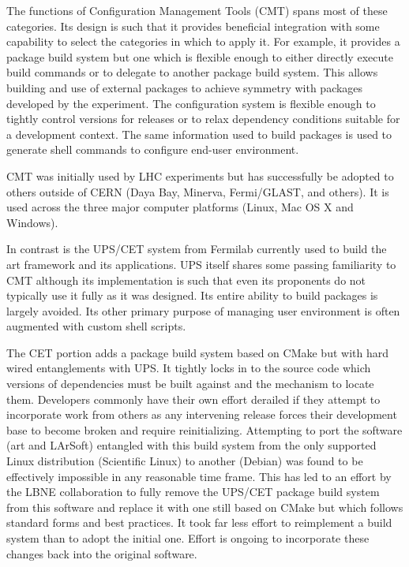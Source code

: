The functions of Configuration Management Tools (CMT) spans most of these categories.
Its design is such that it provides beneficial integration with some
capability to select the categories in which to apply it.  For
example, it provides a package build system but one which is flexible
enough to either directly execute build commands or to delegate to
another package build system.  This allows building and use of
external packages to achieve symmetry with packages developed by the
experiment.  The configuration system is flexible enough to tightly
control versions for releases or to relax dependency conditions
suitable for a development context.  The same information used to
build packages is used to generate shell commands to configure
end-user environment.

CMT was initially used by LHC experiments but has successfully be
adopted to others outside of CERN (Daya Bay, Minerva, Fermi/GLAST, and
others).  It is used across the three major computer platforms (Linux,
Mac OS X and Windows).

In contrast is the UPS/CET system from Fermilab currently used to
build the art framework and its applications.  UPS itself shares some
passing familiarity to CMT although its implementation is such that
even its proponents do not typically use it fully as it was designed.  Its
entire ability to build packages is largely avoided.  Its other
primary purpose of managing user environment is often augmented with
custom shell scripts.  

The CET portion adds a package build system based on CMake but with
hard wired entanglements with UPS.  It tightly locks in to the source
code which versions of dependencies must be built against and the
mechanism to locate them.  Developers commonly have their own effort
derailed if they attempt to incorporate work from others as any
intervening release forces their development base to become broken and
require reinitializing.  Attempting to port the software (art and
LArSoft) entangled with this build system from the only supported
Linux distribution (Scientific Linux) to another (Debian) was found to
be effectively impossible in any reasonable time frame.  This has led
to an effort by the LBNE collaboration to fully remove the UPS/CET
package build system from this software and replace it with one still
based on CMake but which follows standard forms and best practices.
It took far less effort to reimplement a build system than to adopt
the initial one.  Effort is ongoing to incorporate these changes back
into the original software.

